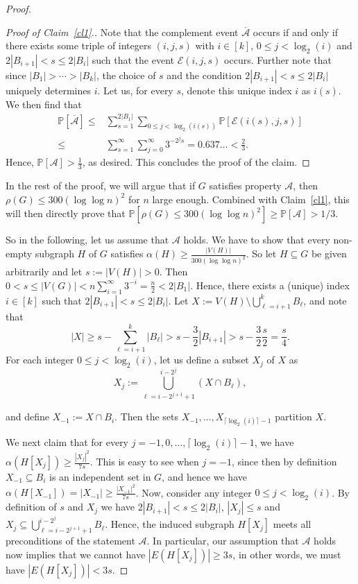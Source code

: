 \documentclass[a4paper,10pt]{amsart}
\begin{document}
\begin{proof}
\begin{proof}[Proof of Claim~\ref{cl1}.]
Note that the complement event $\overline{\mathcal{A}}$ occurs if and only if there exists some triple of integers $(i,j,s)$ with $i\in [k]$, $0\le j<\log_2(i)$ and $2|B_{i+1}|<s\le 2|B_i|$ such that the event $\mathcal{E}(i,j,s)$ occurs. Further note that since $|B_1|>\cdots>|B_k|$, the choice of $s$ and the condition $2|B_{i+1}|<s\le 2|B_i|$ uniquely determines $i$. Let us, for every $s$, denote this unique index $i$ as $i(s)$. We then find that
\begin{align*}\mathbb{P}[\overline{\mathcal{A}}]\le & \sum_{s=1}^{2|B_1|}\sum_{0\le j<\log_2(i(s))}\mathbb{P}[\mathcal{E}(i(s),j,s)]
\\
\le & \sum_{s=1}^{\infty}\sum_{j=0}^{\infty}3^{-2^js}=0.637\ldots<\frac{2}{3}.
\end{align*}
Hence, $\mathbb{P}[\mathcal{A}]>\frac{1}{3}$, as desired. This concludes the proof of the claim.
\end{proof}
In the rest of the proof, we will argue that if $G$ satisfies property $\mathcal{A}$, then $\rho(G)\le 300 (\log \log n)^2$ for $n$ large enough. Combined with Claim~\ref{cl1}, this will then directly prove that $\mathbb{P}[\rho(G)\le 300(\log\log n)^2]\ge \mathbb{P}[\mathcal{A}]>1/3$.  

So in the following, let us assume that $\mathcal{A}$ holds. We have to show that every non-empty subgraph $H$ of $G$ satisfies $\alpha(H)\ge \frac{|V(H)|}{300 (\log \log n)^2}$. 
So let $H\subseteq G$ be given arbitrarily and let $s:=|V(H)|>0$. Then $0<s\le |V(G)|<n\sum_{i=1}^{\infty}3^{-i}=\frac{n}{2}<2|B_1|$. Hence, there exists a (unique) index $i\in [k]$ such that $2|B_{i+1}|<s\le 2|B_i|$. Let $X:=V(H)\setminus \bigcup_{\ell=i+1}^{k}B_\ell$, and note that
$$|X|\ge s-\sum_{\ell=i+1}^{k}|B_\ell|> s-\frac{3}{2}|B_{i+1}|> s-\frac{3}{2}\frac{s}{2}=\frac{s}{4}.$$ For each integer $0\le j<\log_2(i)$, let us define a subset $X_j$ of $X$ as
$$X_j:=\bigcup_{\ell=i-2^{j+1}+1}^{i-2^j}(X\cap B_\ell),$$

and define $X_{-1}:=X\cap B_i$. Then the sets $X_{-1},\ldots,X_{\lceil\log_2(i)\rceil-1}$ partition $X$. 

We next claim that for every $j=-1,0,\ldots,\lceil\log_2(i)\rceil-1$, we have 
$\alpha(H[X_j])\ge \frac{|X_j|^2}{7s}.$
This is easy to see when $j=-1$, since then by definition $X_{-1}\subseteq B_i$ is an independent set in $G$, and hence we have $\alpha(H[X_{-1}])=|X_{-1}|\ge \frac{|X_{-1}|^2}{7s}$. Now, consider any integer $0\le j<\log_2(i)$. By definition of $s$ and $X_j$ we have $2|B_{i+1}|<s\le 2|B_i|$, $|X_j|\le s$ and $X_j\subseteq \bigcup_{\ell=i-2^{j+1}+1}^{i-2^j}B_\ell$. Hence, the induced subgraph $H[X_j]$ meets all preconditions of the statement $\mathcal{A}$. In particular, our assumption that $\mathcal{A}$ holds now implies that we cannot have $|E(H[X_j])|\ge 3s$, in other words, we must have $|E(H[X_j])|< 3s$. 


\end{proof}
\end{document}
